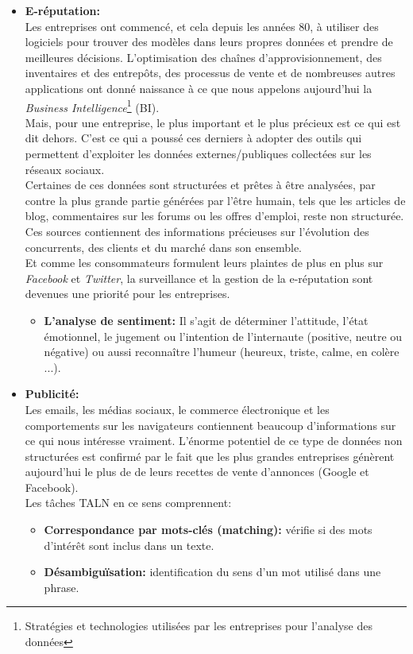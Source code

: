 \begin{itemize}
    \item \textbf{E-réputation:}\\
    Les entreprises ont commencé, et cela depuis les années 80, à utiliser des logiciels pour trouver des modèles dans leurs propres données et prendre de meilleures décisions. L'optimisation des chaînes d'approvisionnement, des inventaires et des entrepôts, des processus de vente et de nombreuses autres applications ont donné naissance à ce que nous appelons aujourd'hui la \emph{Business Intelligence}\footnote{Stratégies et technologies utilisées par les entreprises pour l'analyse des données} (BI).\\ 
    Mais, pour une entreprise, le plus important et le plus précieux est ce qui est dit dehors. C'est ce qui a poussé ces derniers à adopter des outils qui permettent d'exploiter les données externes/publiques collectées sur les réseaux sociaux.\\
    Certaines de ces données sont structurées et prêtes à être analysées, par contre la plus grande partie générées par l'être humain, tels que les articles de blog, commentaires sur les forums ou les offres d'emploi, reste non structurée. Ces sources contiennent des informations précieuses sur l'évolution des concurrents, des clients et du marché dans son ensemble.\\
    Et comme les consommateurs formulent leurs plaintes de plus en plus sur \emph{Facebook} et \emph{Twitter}, la surveillance et la gestion de la e-réputation sont devenues une priorité pour les entreprises.
    \begin{itemize}
        \item \textbf{L'analyse de sentiment:} Il s'agit de déterminer l'attitude, l'état émotionnel, le jugement ou l'intention de l'internaute (positive, neutre ou négative) ou aussi reconnaître l'humeur (heureux, triste, calme, en colère ...).\\
    \end{itemize}

    \item \textbf{Publicité:}\\
    Les emails, les médias sociaux, le commerce électronique et les comportements sur les navigateurs contiennent beaucoup d'informations sur ce qui nous intéresse vraiment. L'énorme potentiel de ce type de données non structurées est confirmé par le fait que les plus grandes entreprises génèrent aujourd'hui le plus de de leurs recettes de vente d'annonces (Google et Facebook).\\ Les tâches TALN en ce sens comprennent:
    \begin{itemize}
        \item \textbf{Correspondance par mots-clés (matching):} vérifie si des mots d'intérêt sont inclus dans un texte. 
        \item \textbf{Désambiguïsation:} identification du sens d'un mot utilisé dans une phrase.
    \end{itemize}
\end{itemize}

